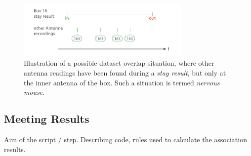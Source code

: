 \begin{figure}[htpb]
\begin{center}
  \includegraphics[width=0.75\textwidth]{assets/pdf/dataset_overlap_nervous_schema.pdf}
  \caption[Dataset overlap illustration]{Illustration of a possible dataset overlap situation, where other antenna readings have been found during a \textit{stay result}, but only at the inner antenna of the box. Such a situation is termed \textit{nervous mouse}.}
  \label{fig:dataset_overlap_nervous}
\end{center}
\end{figure}

\subsection{Meeting Results}
\label{subsec:meetingres}

Aim of the script / step.
Describing code, rules used to calculate the association results.